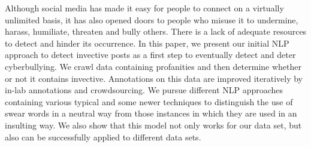 Although social media has made it easy for people to connect on a virtually unlimited basis, it has also opened doors to people who misuse it to undermine, harass, humiliate, threaten and bully others. There is a lack of adequate resources to detect and hinder its occurrence. In this paper, we  present our initial NLP approach to detect invective posts as a first step to eventually detect and deter cyberbullying. We crawl data containing profanities and then determine whether or not it contains invective. Annotations on this data are improved iteratively by in-lab annotations and crowdsourcing. We pursue different NLP approaches containing various typical and some newer techniques to distinguish the use of swear words in a neutral way from those instances in which they are used in an insulting way. We also show that this model not only works for our data set, but also can be successfully applied to different data sets.

